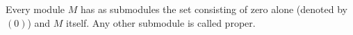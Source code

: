 Every module $M$ has as submodules the set consisting of zero alone (denoted by $(0)$) and $M$ itself. Any other submodule is called proper.
